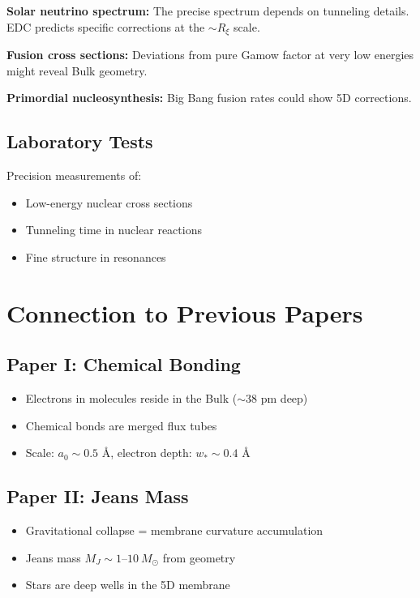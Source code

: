 \documentclass[12pt,a4paper]{article}
\begin{document}
\textbf{Solar neutrino spectrum:} The precise spectrum depends on tunneling details. EDC predicts specific corrections at the $\sim R_\xi$ scale.

\textbf{Fusion cross sections:} Deviations from pure Gamow factor at very low energies might reveal Bulk geometry.

\textbf{Primordial nucleosynthesis:} Big Bang fusion rates could show 5D corrections.

\subsection{Laboratory Tests}

Precision measurements of:
\begin{itemize}
    \item Low-energy nuclear cross sections
    \item Tunneling time in nuclear reactions
    \item Fine structure in resonances
\end{itemize}

\section{Connection to Previous Papers}

\subsection{Paper I: Chemical Bonding}
\begin{itemize}
    \item Electrons in molecules reside in the Bulk ($\sim$38 pm deep)
    \item Chemical bonds are merged flux tubes
    \item Scale: $a_0 \sim 0.5$ Å, electron depth: $w_* \sim 0.4$ Å
\end{itemize}

\subsection{Paper II: Jeans Mass}
\begin{itemize}
    \item Gravitational collapse = membrane curvature accumulation
    \item Jeans mass $M_J \sim 1$--$10\ M_\odot$ from geometry
    \item Stars are deep wells in the 5D membrane
\end{itemize}
\end{document}
